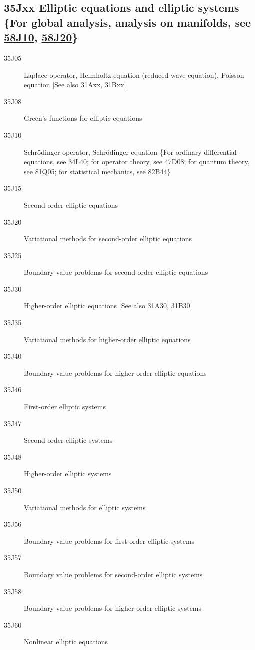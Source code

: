 \documentclass[letterpaper]{article}
\begin{document}
\subsection*{35Jxx  Elliptic equations  and elliptic systems \{For global analysis, analysis on manifolds, see  \hyperref[58J10]{58J10}, \hyperref[58J20]{58J20}\} }\label{35Jxx}
\begin{description}  
\item [35J05]\label{35J05} Laplace operator,  Helmholtz equation  (reduced wave equation), Poisson equation [See also \hyperref[31Axx]{31Axx}, \hyperref[31Bxx]{31Bxx}]
\item [35J08]\label{35J08} Green's functions for elliptic equations
\item [35J10]\label{35J10} Schr\"{o}dinger operator, Schr\"{o}dinger equation  \{For ordinary differential equations, see \hyperref[34L40]{34L40}; for operator theory, see \hyperref[47D08]{47D08}; for quantum theory, see \hyperref[81Q05]{81Q05}; for statistical mechanics, see \hyperref[82B44]{82B44}\}
\item [35J15]\label{35J15} Second-order elliptic equations 
\item [35J20]\label{35J20} Variational methods for second-order elliptic equations
\item [35J25]\label{35J25} Boundary value problems for second-order elliptic equations
\item [35J30]\label{35J30} Higher-order elliptic equations [See also \hyperref[31A30]{31A30}, \hyperref[31B30]{31B30}]
\item [35J35]\label{35J35} Variational methods for higher-order elliptic equations
\item [35J40]\label{35J40} Boundary value problems for higher-order elliptic equations
\item [35J46]\label{35J46} First-order elliptic systems 
\item [35J47]\label{35J47} Second-order elliptic systems
\item [35J48]\label{35J48} Higher-order elliptic systems 
\item [35J50]\label{35J50} Variational methods for elliptic systems 
\item [35J56]\label{35J56} Boundary value problems for first-order elliptic systems 
\item [35J57]\label{35J57} Boundary value problems for second-order elliptic systems 
\item [35J58]\label{35J58} Boundary value problems for higher-order elliptic systems 
\item [35J60]\label{35J60} Nonlinear elliptic equations 

\end{description}
\end{document}

